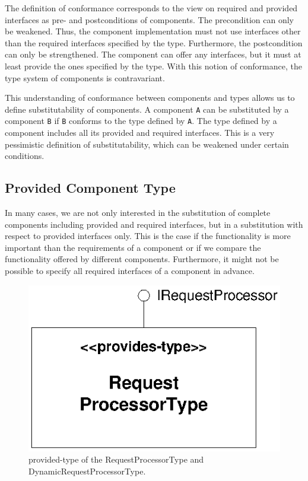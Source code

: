 The definition of conformance corresponds to the view on required and provided
interfaces as pre- and postconditions of components. The precondition can only
be weakened. Thus, the component implementation must not use interfaces other
than the required interfaces specified by the type. Furthermore, the
postcondition can only be strengthened. The component can offer any interfaces,
but it must at least provide the ones specified by the type. With this notion of
conformance, the type system of components is contravariant.

This understanding of conformance between components and types allows us to
define substitutability of components. A component \texttt{A} can be substituted
by a component \texttt{B} if \texttt{B} conforms to the type defined by
\texttt{A}. The type defined by a component includes all its provided and
required interfaces. This is a very pessimistic definition of substitutability,
which can be weakened under certain conditions. 

\subsection{Provided Component Type}

In many cases, we are not only interested in the substitution of complete
components including provided and required interfaces, but in a substitution
with respect to provided interfaces only. This is the case if the functionality
is more important than the requirements of a component or if we compare the
functionality offered by different components. Furthermore, it might not be
possible to specify all required interfaces of a component in advance. 

\begin{figure}[htbp]
\centering
\includegraphics[scale=0.85]{example/ProvidesType}
\caption{provided-type of the RequestProcessorType and
DynamicRequestProcessorType.}
\label{fig:ProvidesType}
\end{figure}

